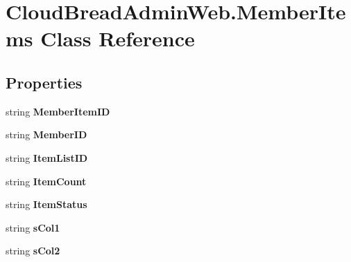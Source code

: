 \hypertarget{a00143}{}\section{Cloud\+Bread\+Admin\+Web.\+Member\+Items Class Reference}
\label{a00143}
\subsection*{Properties}
\begin{DoxyCompactItemize}
\item 
string {\bfseries Member\+Item\+ID}\hypertarget{a00143_a0577e57d1269b354ccfd15671401307c}{}\label{a00143_a0577e57d1269b354ccfd15671401307c}

\item 
string {\bfseries Member\+ID}\hypertarget{a00143_a7b9f6ed4f5252205b4f687bf54a6979f}{}\label{a00143_a7b9f6ed4f5252205b4f687bf54a6979f}

\item 
string {\bfseries Item\+List\+ID}\hypertarget{a00143_adb9745307d442fb1cb0e3b0415dd008d}{}\label{a00143_adb9745307d442fb1cb0e3b0415dd008d}

\item 
string {\bfseries Item\+Count}\hypertarget{a00143_a1e318c3a311cee7fb0d3fcf09006b740}{}\label{a00143_a1e318c3a311cee7fb0d3fcf09006b740}

\item 
string {\bfseries Item\+Status}\hypertarget{a00143_a7524dffb16970de18262cde85634da7e}{}\label{a00143_a7524dffb16970de18262cde85634da7e}

\item 
string {\bfseries s\+Col1}\hypertarget{a00143_a910c117726957321f1db76a3aafb47b6}{}\label{a00143_a910c117726957321f1db76a3aafb47b6}

\item 
string {\bfseries s\+Col2}\hypertarget{a00143_af7e914f6962236b6aac35ab7638a67f6}{}\label{a00143_af7e914f6962236b6aac35ab7638a67f6}


\end{DoxyCompactItemize}
